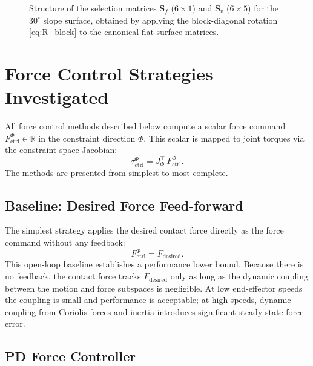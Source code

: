 \documentclass[
	german,%
	accentcolor=9c,%
	ruledheaders=section,%
	class=report,%
	thesis={type=bachelor},%
	fontsize=11pt,%
	parskip=half-,%
	custommargins=true,%
	marginpar=false,%
]{tudapub}
\begin{document}
\begin{figure}[htbp]
    \centering
    \caption{Structure of the selection matrices $\mathbf{S}_f$ ($6\times1$)
             and $\mathbf{S}_v$ ($6\times5$) for the $30^\circ$ slope surface,
             obtained by applying the block-diagonal rotation
             \eqref{eq:R_block} to the canonical flat-surface matrices.}
    \label{fig:selection_matrices_slope}
\end{figure}


\section{Force Control Strategies Investigated}
\label{sec:force_strategies}

All force control methods described below compute a scalar force command
\(F^\Phi_\text{ctrl} \in \mathbb{R}\) in the constraint direction
\(\Phi\).
This scalar is mapped to joint torques via the constraint-space Jacobian:
\begin{equation}
    \tau^\Phi_\text{ctrl} = J_\Phi^\top\,F^\Phi_\text{ctrl}.
\end{equation}
The methods are presented from simplest to most complete.

\subsection{Baseline: Desired Force Feed-forward}
\label{sec:ff_baseline}

The simplest strategy applies the desired contact force directly as the
force command without any feedback:
\begin{equation}
    F^\Phi_\text{ctrl} = F_\text{desired}.
\end{equation}
This open-loop baseline establishes a performance lower bound.
Because there is no feedback, the contact force tracks \(F_\text{desired}\)
only as long as the dynamic coupling between the motion and force subspaces
is negligible.
At low end-effector speeds the coupling is small and performance is acceptable;
at high speeds, dynamic coupling from Coriolis forces and inertia introduces
significant steady-state force error.

\subsection{PD Force Controller}
\label{sec:pd_force}
\end{document}
